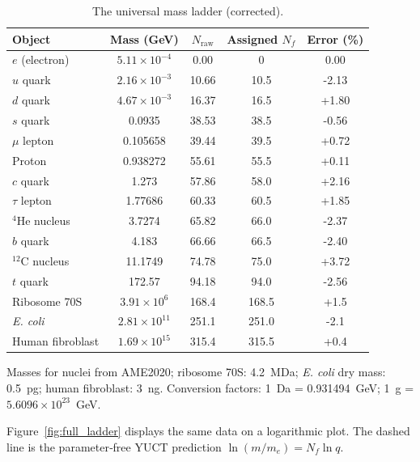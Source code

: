 \documentclass[12pt,a4paper]{article}
\begin{document}
	\begin{table}[htbp]
		\centering
		\caption{The universal mass ladder (corrected).}
		\label{tab:full_ladder}
		\small
		\begin{tabular}{l c c c c}
			\toprule
			Object & Mass (GeV) & \(N_{\text{raw}}\) & Assigned \(N_f\) & Error (\%) \\
			\midrule
			\(e\) (electron) & \(5.11\times10^{-4}\) & 0.00  & 0      & 0.00 \\
			\(u\) quark      & \(2.16\times10^{-3}\) & 10.66 & 10.5   & -2.13 \\
			\(d\) quark      & \(4.67\times10^{-3}\) & 16.37 & 16.5   & +1.80 \\
			\(s\) quark      & 0.0935               & 38.53 & 38.5   & -0.56 \\
			\(\mu\) lepton    & 0.105658             & 39.44 & 39.5   & +0.72 \\
			Proton           & 0.938272             & 55.61 & 55.5   & +0.11 \\
			\(c\) quark      & 1.273                & 57.86 & 58.0   & +2.16 \\
			\(\tau\) lepton   & 1.77686              & 60.33 & 60.5   & +1.85 \\
			\(^4\)He nucleus  & 3.7274               & 65.82 & 66.0   & -2.37 \\
			\(b\) quark      & 4.183                & 66.66 & 66.5   & -2.40 \\
			\(^{12}\)C nucleus& 11.1749              & 74.78 & 75.0   & +3.72 \\
			\(t\) quark      & 172.57               & 94.18 & 94.0   & -2.56 \\
			Ribosome 70S     & \(3.91\times10^6\)   & 168.4 & 168.5  & +1.5  \\
			\textit{E. coli} & \(2.81\times10^{11}\)& 251.1 & 251.0  & -2.1  \\
			Human fibroblast & \(1.69\times10^{15}\)& 315.4 & 315.5  & +0.4  \\
			\bottomrule
		\end{tabular}
		\par\smallskip
		\footnotesize
		Masses for nuclei from AME2020; ribosome 70S: 4.2~MDa; \textit{E. coli} dry mass: 0.5~pg; human fibroblast: 3~ng.  
		Conversion factors: 1~Da = 0.931494~GeV; 1~g = \(5.6096\times10^{23}\)~GeV.
	\end{table}
	
	Figure~\ref{fig:full_ladder} displays the same data on a logarithmic plot.  
	The dashed line is the parameter‑free YUCT prediction \(\ln(m/m_e) = N_f \ln q\).
	
\end{document}
